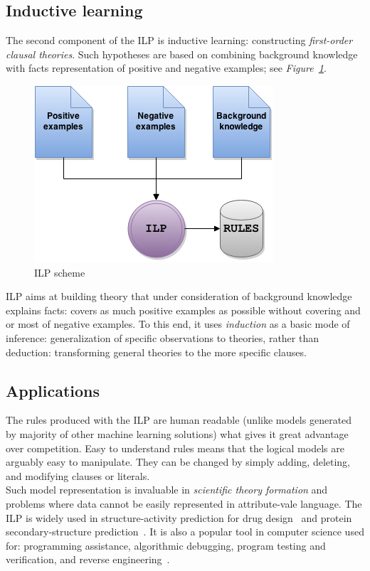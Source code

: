 \documentclass[10pt, a4paper, pdflatex, leqno, twoside, openright]{report}
\begin{document}
    \subsection{Inductive learning}
The second component of the ILP is inductive learning: constructing \emph{first-order clausal theories}. Such hypotheses are based on combining background knowledge with facts representation of positive and negative examples; see \emph{Figure~\ref{fig:ilp}}.\\
\begin{figure}[htb]
  \centering
  \includegraphics[scale=.5]{./gfx/ilp}
  \caption{ILP scheme\label{fig:ilp}}
\end{figure}
ILP aims at building theory that under consideration of background knowledge explains facts: covers as much positive examples as possible without covering and or most of negative examples. To this end, it uses \emph{induction} as a basic mode of inference: generalization of specific observations to theories, rather than deduction: transforming general theories to the more specific clauses.

    \subsection{Applications}
The rules produced with the ILP are human readable (unlike models generated by majority of other machine learning solutions) what gives it great advantage over competition. Easy to understand rules means that the logical models are arguably easy to manipulate. They can be changed by simply adding, deleting, and modifying clauses or literals.\\
Such model representation is invaluable in \emph{scientific theory formation} and problems where data cannot be easily represented in attribute-vale language. The ILP is widely used in structure-activity prediction for drug design~\citep{king1992drug,michael1992modelling} and protein secondary-structure prediction~\citep{muggleton1992protein}. It is also a popular tool in computer science used for: programming assistance, algorithmic debugging, program testing and verification, and reverse engineering~\citep{shapiro1983algorithmic,bergadno1993inductive,bratko1993inductive}.\\
\end{document}
